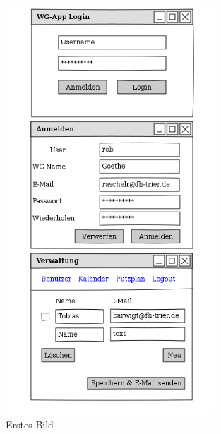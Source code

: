 \begin{figure}[htbp] 
  \centering
     \includegraphics[width=0.7\textwidth]{anhang/mockups/webpage.png}
  \caption{Erstes Bild}
  \label{fig:Bild1}
\end{figure}

 
% 

